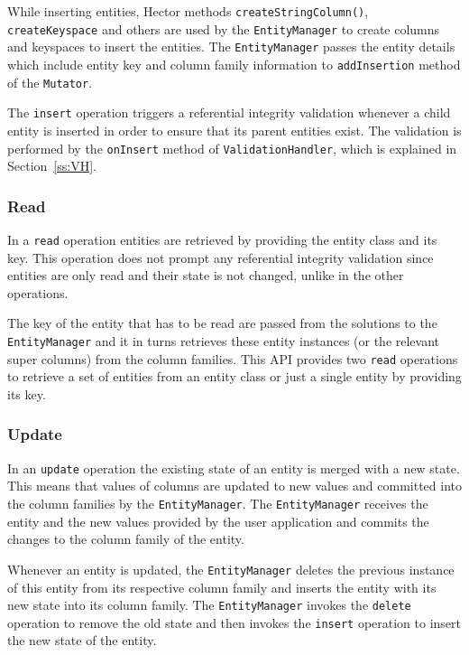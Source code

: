 		While inserting entities,  Hector methods \texttt{createStringColumn()}, 
		\texttt{createKeyspace} and others are used by the \texttt{EntityManager} to
		create columns and keyspaces to insert the entities. The
		\texttt{EntityManager} passes the entity details which include entity key and
		column family information to \texttt{addInsertion} method of the \texttt{Mutator}.

		 The \texttt{insert} operation triggers a referential integrity
		validation whenever a child entity is  inserted in order to ensure that its
		parent entities exist. The validation is performed by the \texttt{onInsert}
		method of \texttt{ValidationHandler}, which is explained in
		Section~\ref{ss:VH}.
	
		\subsubsection{Read}
		In a \texttt{read} operation  entities are  retrieved by providing the
		entity class and its key. This operation does not prompt any referential integrity
		validation since entities are only read and their state is not changed, 
		 unlike in the other operations. 

		The key of the entity  that has to be read are passed from the
		solutions to the \texttt{EntityManager} and it in turns retrieves these entity
		instances (or the relevant super columns) from the column families.  This
		\ac{API} provides two \texttt{read} operations to retrieve a set of
		entities from an entity class or just a single entity by providing its key.
		
		
		\subsubsection{Update}\label{ss:update}
		In an \texttt{update} operation the existing state of an entity is merged
		with a new state. 
		This means that  values of columns are updated to new values and
		 committed into the column families by the \texttt{EntityManager}.  The
		\texttt{EntityManager} receives the entity and the new values provided by the user
		application and commits the changes to the column family of the entity. 
		
		Whenever an entity is updated, the \texttt{EntityManager} deletes the
		previous instance of this entity from its respective column family and inserts
		the entity with its new state into its column family.
		The \texttt{EntityManager} invokes  the \texttt{delete} operation to remove
		the old state and then invokes the \texttt{insert} operation to insert the new
		state of the entity.
		
